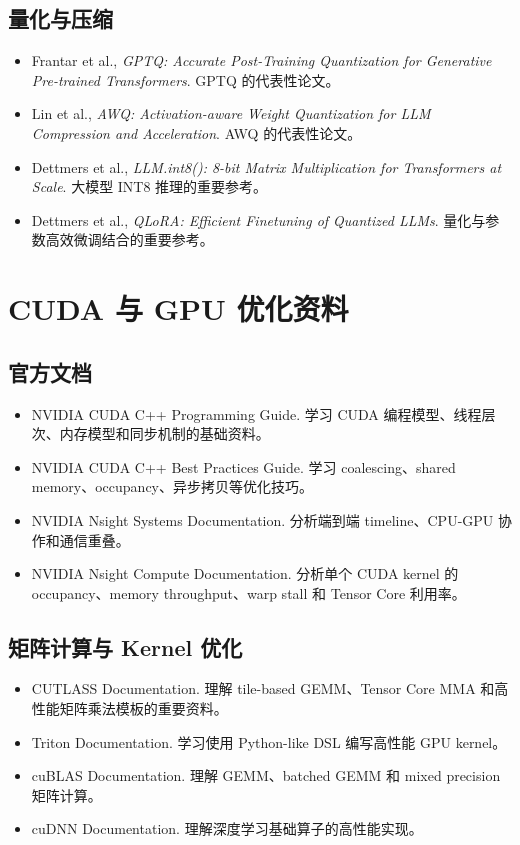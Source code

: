 \subsection{量化与压缩}

\begin{itemize}
\item Frantar et al., \textit{GPTQ: Accurate Post-Training Quantization for Generative Pre-trained Transformers}. GPTQ 的代表性论文。
\item Lin et al., \textit{AWQ: Activation-aware Weight Quantization for LLM Compression and Acceleration}. AWQ 的代表性论文。
\item Dettmers et al., \textit{LLM.int8(): 8-bit Matrix Multiplication for Transformers at Scale}. 大模型 INT8 推理的重要参考。
\item Dettmers et al., \textit{QLoRA: Efficient Finetuning of Quantized LLMs}. 量化与参数高效微调结合的重要参考。
\end{itemize}

\section{CUDA 与 GPU 优化资料}

\subsection{官方文档}

\begin{itemize}
\item NVIDIA CUDA C++ Programming Guide. 学习 CUDA 编程模型、线程层次、内存模型和同步机制的基础资料。
\item NVIDIA CUDA C++ Best Practices Guide. 学习 coalescing、shared memory、occupancy、异步拷贝等优化技巧。
\item NVIDIA Nsight Systems Documentation. 分析端到端 timeline、CPU-GPU 协作和通信重叠。
\item NVIDIA Nsight Compute Documentation. 分析单个 CUDA kernel 的 occupancy、memory throughput、warp stall 和 Tensor Core 利用率。
\end{itemize}

\subsection{矩阵计算与 Kernel 优化}

\begin{itemize}
\item CUTLASS Documentation. 理解 tile-based GEMM、Tensor Core MMA 和高性能矩阵乘法模板的重要资料。
\item Triton Documentation. 学习使用 Python-like DSL 编写高性能 GPU kernel。
\item cuBLAS Documentation. 理解 GEMM、batched GEMM 和 mixed precision 矩阵计算。
\item cuDNN Documentation. 理解深度学习基础算子的高性能实现。
\end{itemize}

